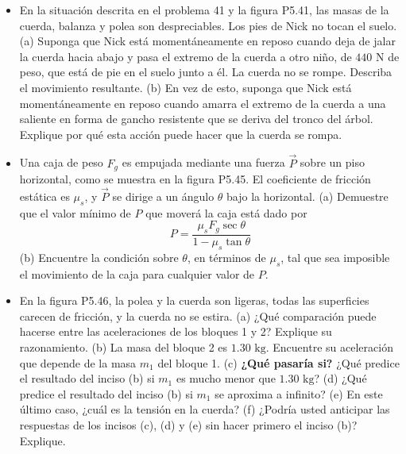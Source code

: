 \documentclass[11pt,a4paper]{article}
\begin{document}
\begin{itemize}
    \item[\textbf{44.}] En la situación descrita en el problema 41 y la figura P5.41, las masas de la cuerda, balanza y polea son despreciables. Los pies de Nick no tocan el suelo. (a) Suponga que Nick está momentáneamente en reposo cuando deja de jalar la cuerda hacia abajo y pasa el extremo de la cuerda a otro niño, de $440 \text{ N}$ de peso, que está de pie en el suelo junto a él. La cuerda no se rompe. Describa el movimiento resultante. (b) En vez de esto, suponga que Nick está momentáneamente en reposo cuando amarra el extremo de la cuerda a una saliente en forma de gancho resistente que se deriva del tronco del árbol. Explique por qué esta acción puede hacer que la cuerda se rompa.
    \vspace*{6cm}

    \item[\textbf{45.}] Una caja de peso $F_g$ es empujada mediante una fuerza $\vec{P}$ sobre un piso horizontal, como se muestra en la figura P5.45. El coeficiente de fricción estática es $\mu_s$, y $\vec{P}$ se dirige a un ángulo $\theta$ bajo la horizontal. (a) Demuestre que el valor mínimo de $P$ que moverá la caja está dado por
    $$ P = \frac{\mu_s F_g \sec\theta}{1 - \mu_s \tan\theta} $$
    (b) Encuentre la condición sobre $\theta$, en términos de $\mu_s$, tal que sea imposible el movimiento de la caja para cualquier valor de $P$.
    \vspace*{6cm}

    \item[\textbf{46.}] En la figura P5.46, la polea y la cuerda son ligeras, todas las superficies carecen de fricción, y la cuerda no se estira. (a) ¿Qué comparación puede hacerse entre las aceleraciones de los bloques 1 y 2? Explique su razonamiento. (b) La masa del bloque 2 es $1.30 \text{ kg}$. Encuentre su aceleración que depende de la masa $m_1$ del bloque 1. (c) \textbf{¿Qué pasaría si?} ¿Qué predice el resultado del inciso (b) si $m_1$ es mucho menor que $1.30 \text{ kg}$? (d) ¿Qué predice el resultado del inciso (b) si $m_1$ se aproxima a infinito? (e) En este último caso, ¿cuál es la tensión en la cuerda? (f) ¿Podría usted anticipar las respuestas de los incisos (c), (d) y (e) sin hacer primero el inciso (b)? Explique.
    \vspace*{8cm}
\end{itemize}

\newpage
\end{document}
